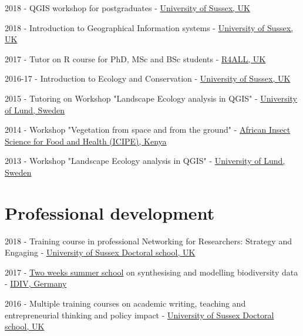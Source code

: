 \documentclass[12pt,a4paper,serif]{moderncv}        %
\begin{document}
\begin{bibenum}

     \item[] 2018 - QGIS workshop for postgraduates - \href{http://sussex.ac.uk/}{University of Sussex, UK}
     
     \item[] 2018 - Introduction to Geographical Information systems - \href{http://sussex.ac.uk/}{University of Sussex, UK}

     \item[] 2017 - Tutor on R course for PhD, MSc and BSc students - \href{http://www.r4all.org/}{R4ALL, UK}
     
     \item[] 2016-17 - Introduction to Ecology and Conservation - \href{http://sussex.ac.uk/}{University of Sussex, UK}

     \item[] 2015 - Tutoring on Workshop "Landscape Ecology analysis in QGIS" - \href{http://www.lunduniversity.lu.se/}{University of Lund, Sweden}

     \item[] 2014 - Workshop "Vegetation from space and from the ground" - \href{http://www.icipe.org/}{African Insect Science for Food and Health (ICIPE), Kenya}

     \item[] 2013 - Workshop "Landscape Ecology analysis in QGIS" - \href{http://www.lunduniversity.lu.se/}{University of Lund, Sweden}

\end{bibenum}

\vspace{8pt}

\section{Professional development}

\begin{bibenum}

    \item[] 2018 - Training course in professional Networking for Researchers: Strategy and Engaging
    - \href{http://www.sussex.ac.uk}{University of Sussex Doctoral school, UK}
    
    \item[] 2017 - \href{https://www.idiv.de/en/events/summer_school.html}{Two weeks summer school} on synthesising and modelling biodiversity data - \href{http://www.idiv.de}{IDIV, Germany}
    
    \item[] 2016 - Multiple training courses on academic writing, teaching and entrepreneurial thinking and policy impact - \href{http://www.sussex.ac.uk}{University of Sussex Doctoral school, UK}

\end{bibenum}
\end{document}
